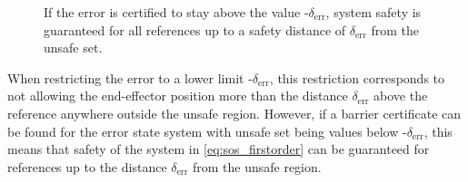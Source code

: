 


\begin{figure}[H]
\centering
{}%
\hspace{3mm}
%
\hspace{3mm}
%
\caption{If the error is certified to stay above the value -$\delta_\text{err}$, system safety is guaranteed for all references up to a safety distance of $\delta_\text{err}$ from the unsafe set.}
	\label{fig:sets_error}
\end{figure}

When restricting the error to a lower limit -$\delta_\text{err}$, this restriction corresponds to not allowing the end-effector position more than the distance $\delta_\text{err}$ above the reference anywhere outside the unsafe region. However, if a barrier certificate can be found for the error state system with unsafe set being values below -$\delta_\text{err}$, this means that safety of the system in \autoref{eq:sos_firstorder} can be guaranteed for references up to  the distance $\delta_\text{err}$ from the unsafe region.



